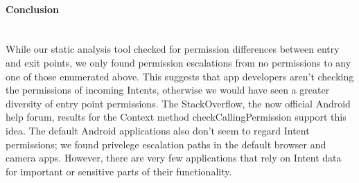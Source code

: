 \documentclass[12pt,a4paper]{article}
\begin{document}
\paragraph{Conclusion} ~\\
While our static analysis tool checked for permission differences between
entry and exit points, we only found permission escalations from no permissions
to any one of those enumerated above. This suggests that app developers aren't
checking the permissions of incoming Intents, otherwise we would have seen a
greater diversity of entry point permissions. The StackOverflow, the now
official Android help forum, results for the Context method
checkCallingPermission support this idea. The default Android applications also
don't seem to regard Intent permissions; we found privelege escalation paths in
the default browser and camera apps. However, there are very few applications
that rely on Intent data for important or sensitive parts of their
functionality.  
 
\end{document}
